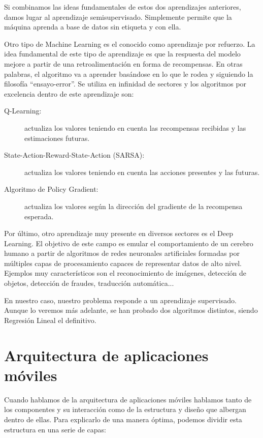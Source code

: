 	Si combinamos las ideas fundamentales de estos dos aprendizajes anteriores, damos lugar al aprendizaje semisupervisado. Simplemente permite que la máquina aprenda a base de datos sin etiqueta y con ella.
	
	Otro tipo de Machine Learning es el conocido como aprendizaje por refuerzo. La idea fundamental de este tipo de aprendizaje es que la respuesta del modelo mejore a partir de una retroalimentación en forma de recompensas. En otras palabras, el algoritmo va a aprender basándose en lo que le rodea y siguiendo la filosofía “ensayo-error”. Se utiliza en infinidad de sectores y los algoritmos por excelencia dentro de este aprendizaje son:
			\begin{description}
				\item [Q-Learning:] actualiza los valores teniendo en cuenta las recompensas recibidas y las estimaciones futuras.
				\item [State-Action-Reward-State-Action (SARSA):] actualiza los valores teniendo en cuenta las acciones presentes y las futuras.
				\item [Algoritmo de Policy Gradient:] actualiza los valores según la dirección del gradiente de la recompensa esperada.
			\end{description}
	
	Por último, otro aprendizaje muy presente en diversos sectores es el Deep Learning. El objetivo de este campo es emular el comportamiento de un cerebro humano a partir de algoritmos de redes neuronales artificiales formadas por múltiples capas de procesamiento capaces de representar datos de alto nivel. Ejemplos muy característicos son el reconocimiento de imágenes, detección de objetos, detección de fraudes, traducción automática...
	
	En nuestro caso, nuestro problema responde a un aprendizaje supervisado. Aunque lo veremos más adelante, se han probado dos algoritmos distintos, siendo Regresión Lineal el definitivo.
	
\section{Arquitectura de aplicaciones móviles}

	Cuando hablamos de la arquitectura de aplicaciones móviles hablamos tanto de los componentes y su interacción como de la estructura y diseño que albergan dentro de ellas. Para explicarlo de una manera óptima, podemos dividir esta estructura en una serie de capas:
	
